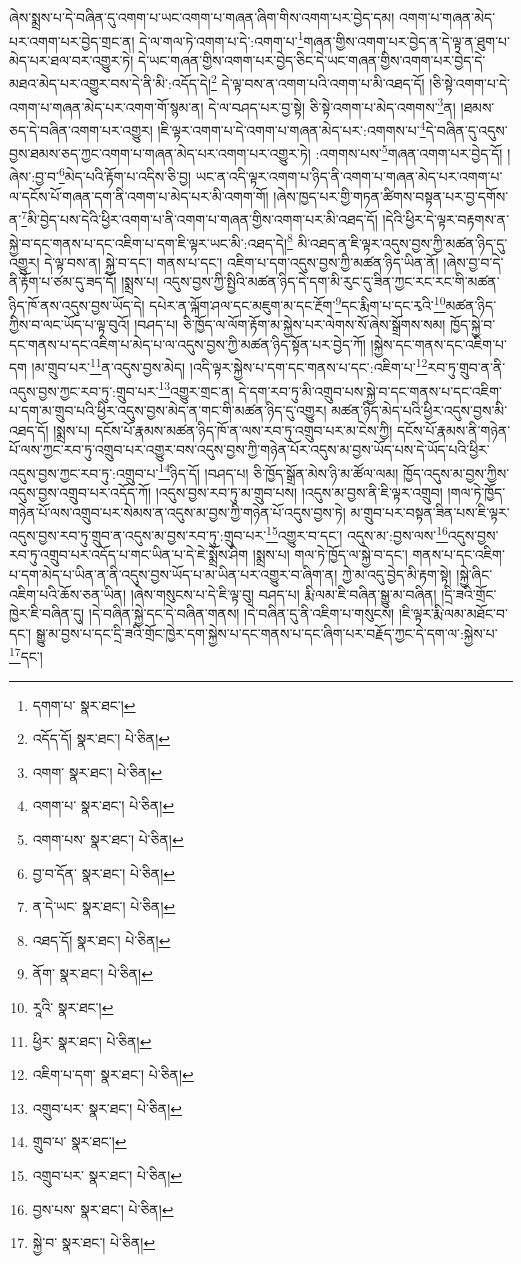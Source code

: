 ཞེས་སྨྲས་པ་དེ་བཞིན་དུ་འགག་པ་ཡང་འགག་པ་གཞན་ཞིག་གིས་འགག་པར་བྱེད་དམ། འགག་པ་གཞན་མེད་པར་འགག་པར་བྱེད་གྲང་ན། དེ་ལ་གལ་ཏེ་འགག་པ་དེ་:འགག་པ་\footnote{དགག་པ་  སྣར་ཐང་། }གཞན་གྱིས་འགག་པར་བྱེད་ན་དེ་ལྟ་ན་ཐུག་པ་མེད་པར་ཐལ་བར་འགྱུར་ཏེ། དེ་ཡང་གཞན་གྱིས་འགག་པར་བྱེད་ཅིང་དེ་ཡང་གཞན་གྱིས་འགག་པར་བྱེད་དེ་མཐའ་མེད་པར་འགྱུར་བས་དེ་ནི་མི་:འདོད་དེ།\footnote{འདོད་དོ།  སྣར་ཐང་།  པེ་ཅིན། } དེ་ལྟ་བས་ན་འགག་པའི་འགག་པ་མི་འཐད་དོ། །ཅི་སྟེ་འགག་པ་དེ་འགག་པ་གཞན་མེད་པར་འགག་གོ་སྙམ་ན། དེ་ལ་བཤད་པར་བྱ་སྟེ། ཅི་སྟེ་འགག་པ་མེད་འགགས་\footnote{འགག་  སྣར་ཐང་།  པེ་ཅིན། }ན། །ཐམས་ཅད་དེ་བཞིན་འགག་པར་འགྱུར། །ཇི་ལྟར་འགག་པ་དེ་འགག་པ་གཞན་མེད་པར་:འགགས་པ་\footnote{འགག་པ་  སྣར་ཐང་།  པེ་ཅིན། }དེ་བཞིན་དུ་འདུས་བྱས་ཐམས་ཅད་ཀྱང་འགག་པ་གཞན་མེད་པར་འགག་པར་འགྱུར་ཏེ། :འགགས་པས་\footnote{འགག་པས་  སྣར་ཐང་།  པེ་ཅིན། }གཞན་འགག་པར་བྱེད་དོ། །ཞེས་:བྱ་བ་\footnote{བྱ་བ་དོན་  སྣར་ཐང་།  པེ་ཅིན། }མེད་པའི་རྟོག་པ་འདིས་ཅི་བྱ། ཡང་ན་འདི་ལྟར་འགག་པ་ཉིད་ནི་འགག་པ་གཞན་མེད་པར་འགག་པ་ལ་དངོས་པོ་གཞན་དག་ནི་འགག་པ་མེད་པར་མི་འགག་གོ། །ཞེས་ཁྱད་པར་གྱི་གཏན་ཚིགས་བསྟན་པར་བྱ་དགོས་ན་\footnote{ན་དེ་ཡང་  སྣར་ཐང་།  པེ་ཅིན། }མི་བྱེད་པས་དེའི་ཕྱིར་འགག་པ་ནི་འགག་པ་གཞན་གྱིས་འགག་པར་མི་འཐད་དོ། །དེའི་ཕྱིར་དེ་ལྟར་བརྟགས་ན་སྐྱེ་བ་དང་གནས་པ་དང་འཇིག་པ་དག་ཇི་ལྟར་ཡང་མི་:འཐད་དེ།\footnote{འཐད་དོ།  སྣར་ཐང་།  པེ་ཅིན། } མི་འཐད་ན་ཇི་ལྟར་འདུས་བྱས་ཀྱི་མཚན་ཉིད་དུ་འགྱུར། དེ་ལྟ་བས་ན། སྐྱེ་བ་དང་། གནས་པ་དང་། འཇིག་པ་དག་འདུས་བྱས་ཀྱི་མཚན་ཉིད་ཡིན་ནོ། །ཞེས་བྱ་བ་དེ་ནི་རྟོག་པ་ཙམ་དུ་ཟད་དོ། །སྨྲས་པ། འདུས་བྱས་ཀྱི་སྤྱིའི་མཚན་ཉིད་དེ་དག་མི་རུང་དུ་ཟིན་ཀྱང་རང་རང་གི་མཚན་ཉིད་ཁོ་ནས་འདུས་བྱས་ཡོད་དེ། དཔེར་ན་ལྐོག་ཤལ་དང་མཇུག་མ་དང་རྔོག་\footnote{ནོག་  སྣར་ཐང་།  པེ་ཅིན། }དང་རྨིག་པ་དང་རྭའི་\footnote{རཱའི་  སྣར་ཐང་། }མཚན་ཉིད་ཀྱིས་བ་ལང་ཡོད་པ་ལྟ་བུའོ། །བཤད་པ། ཅི་ཁྱོད་ལ་ལོག་རྟོག་མ་སྐྱེས་པར་ལེགས་སོ་ཞེས་སྒྲོགས་སམ། ཁྱོད་སྐྱེ་བ་དང་གནས་པ་དང་འཇིག་པ་མེད་པ་ལ་འདུས་བྱས་ཀྱི་མཚན་ཉིད་སྟོན་པར་བྱེད་ཀོ། །སྐྱེས་དང་གནས་དང་འཇིག་པ་དག །མ་གྲུབ་པར་\footnote{ཕྱིར་  སྣར་ཐང་།  པེ་ཅིན། }ན་འདུས་བྱས་མེད། །འདི་ལྟར་སྐྱེས་པ་དག་དང་གནས་པ་དང་:འཇིག་པ་\footnote{འཇིག་པ་དག་  སྣར་ཐང་།  པེ་ཅིན། }རབ་ཏུ་གྲུབ་ན་ནི་འདུས་བྱས་ཀྱང་རབ་ཏུ་:གྲུབ་པར་\footnote{འགྲུབ་པར་  སྣར་ཐང་།  པེ་ཅིན། }འགྱུར་གྲང་ན། དེ་དག་རབ་ཏུ་མི་འགྲུབ་པས་སྐྱེ་བ་དང་གནས་པ་དང་འཇིག་པ་དག་མ་གྲུབ་པའི་ཕྱིར་འདུས་བྱས་མེད་ན་གང་གི་མཚན་ཉིད་དུ་འགྱུར། མཚན་ཉིད་མེད་པའི་ཕྱིར་འདུས་བྱས་མི་འཐད་དོ། །སྨྲས་པ། དངོས་པོ་རྣམས་མཚན་ཉིད་ཁོ་ན་ལས་རབ་ཏུ་འགྲུབ་པར་མ་ངེས་ཀྱི། དངོས་པོ་རྣམས་ནི་གཉེན་པོ་ལས་ཀྱང་རབ་ཏུ་འགྲུབ་པར་འགྱུར་བས་འདུས་བྱས་ཀྱི་གཉེན་པོར་འདུས་མ་བྱས་ཡོད་པས་དེ་ཡོད་པའི་ཕྱིར་འདུས་བྱས་ཀྱང་རབ་ཏུ་:འགྲུབ་པ་\footnote{གྲུབ་པ་  སྣར་ཐང་། }ཉིད་དོ། །བཤད་པ། ཅི་ཁྱོད་སྒྲོན་མེས་ཉི་མ་ཚོལ་ལམ། ཁྱོད་འདུས་མ་བྱས་ཀྱིས་འདུས་བྱས་འགྲུབ་པར་འདོད་ཀོ། །འདུས་བྱས་རབ་ཏུ་མ་གྲུབ་པས། །འདུས་མ་བྱས་ནི་ཇི་ལྟར་འགྲུབ། །གལ་ཏེ་ཁྱོད་གཉེན་པོ་ལས་འགྲུབ་པར་སེམས་ན་འདུས་མ་བྱས་ཀྱི་གཉེན་པོ་འདུས་བྱས་ཏེ། མ་གྲུབ་པར་བསྟན་ཟིན་པས་ཇི་ལྟར་འདུས་བྱས་རབ་ཏུ་གྲུབ་ན་འདུས་མ་བྱས་རབ་ཏུ་:གྲུབ་པར་\footnote{འགྲུབ་པར་  སྣར་ཐང་།  པེ་ཅིན། }འགྱུར་བ་དང་། འདུས་མ་:བྱས་ལས་\footnote{བྱས་པས་  སྣར་ཐང་།  པེ་ཅིན། }འདུས་བྱས་རབ་ཏུ་འགྲུབ་པར་འདོད་པ་གང་ཡིན་པ་དེ་ཇེ་སྨྲོས་ཤིག །སྨྲས་པ། གལ་ཏེ་ཁྱོད་ལ་སྐྱེ་བ་དང་། གནས་པ་དང་འཇིག་པ་དག་མེད་པ་ཡིན་ན་ནི་འདུས་བྱས་ཡོད་པ་མ་ཡིན་པར་འགྱུར་བ་ཞིག་ན། ཀྱེ་མ་འདུ་བྱེད་མི་རྟག་སྟེ། །སྐྱེ་ཞིང་འཇིག་པའི་ཆོས་ཅན་ཡིན། །ཞེས་གསུངས་པ་དེ་ཇི་ལྟ་བུ། བཤད་པ། རྨི་ལམ་ཇི་བཞིན་སྒྱུ་མ་བཞིན། །དྲི་ཟའི་གྲོང་ཁྱེར་ཇི་བཞིན་དུ། །དེ་བཞིན་སྐྱེ་དང་དེ་བཞིན་གནས། །དེ་བཞིན་དུ་ནི་འཇིག་པ་གསུངས། །ཇི་ལྟར་རྨི་ལམ་མཐོང་བ་དང་། སྒྱུ་མ་བྱས་པ་དང་དྲི་ཟའི་གྲོང་ཁྱེར་དག་སྐྱེས་པ་དང་གནས་པ་དང་ཞིག་པར་བརྗོད་ཀྱང་དེ་དག་ལ་:སྐྱེས་པ་\footnote{སྐྱེ་བ་  སྣར་ཐང་།  པེ་ཅིན། }དང་། 